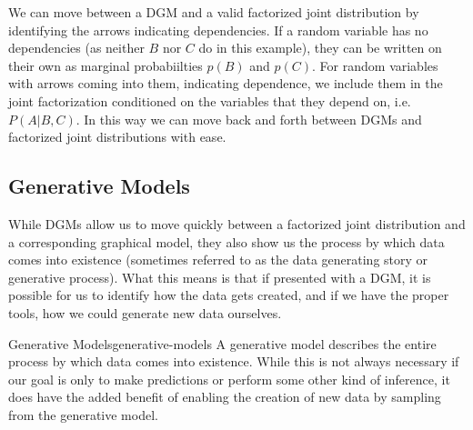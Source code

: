 We can move between a DGM and a valid factorized joint distribution by identifying the arrows indicating dependencies. If a random variable has no dependencies (as neither $B$ nor $C$ do in this example), they can be written on their own as marginal probabiilties $p(B)$ and $p(C)$. For random variables with arrows coming into them, indicating dependence, we include them in the joint factorization conditioned on the variables that they depend on, i.e. $P(A | B, C)$. In this way we can move back and forth between DGMs and factorized joint distributions with ease.

\subsection{Generative Models}
While DGMs allow us to move quickly between a factorized joint distribution and a corresponding graphical model, they also show us the process by which data comes into existence (sometimes referred to as the data generating story or generative process). What this means is that if presented with a DGM, it is possible for us to identify how the data gets created, and if we have the proper tools, how we could generate new data ourselves.

\begin{definition}{Generative Models}{generative-models}
    A generative model describes the entire process by which data comes into existence. While this is not always necessary if our goal is only to make predictions or perform some other kind of inference, it does have the added benefit of enabling the creation of new data by sampling from the generative model.
\end{definition}


